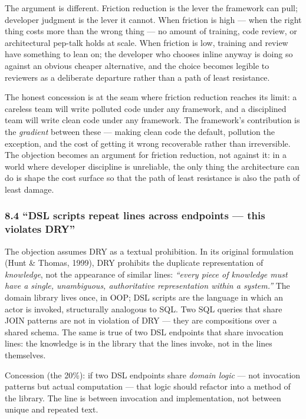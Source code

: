 \documentclass[
]{article}
\begin{document}
The argument is different. Friction reduction is the lever the framework
can pull; developer judgment is the lever it cannot. When friction is
high --- when the right thing costs more than the wrong thing --- no
amount of training, code review, or architectural pep-talk holds at
scale. When friction is low, training and review have something to lean
on; the developer who chooses inline anyway is doing so against an
obvious cheaper alternative, and the choice becomes legible to reviewers
as a deliberate departure rather than a path of least resistance.

The honest concession is at the seam where friction reduction reaches
its limit: a careless team will write polluted code under any framework,
and a disciplined team will write clean code under any framework. The
framework's contribution is the \emph{gradient} between these --- making
clean code the default, pollution the exception, and the cost of getting
it wrong recoverable rather than irreversible. The objection becomes an
argument for friction reduction, not against it: in a world where
developer discipline is unreliable, the only thing the architecture can
do is shape the cost surface so that the path of least resistance is
also the path of least damage.

\subsubsection{8.4 ``DSL scripts repeat lines across endpoints --- this
violates
DRY''}\label{dsl-scripts-repeat-lines-across-endpoints-this-violates-dry}

The objection assumes DRY as a textual prohibition. In its original
formulation (Hunt \& Thomas, 1999), DRY prohibits the duplicate
representation of \emph{knowledge}, not the appearance of similar lines:
\emph{``every piece of knowledge must have a single, unambiguous,
authoritative representation within a system.''} The domain library
lives once, in OOP; DSL scripts are the language in which an actor is
invoked, structurally analogous to SQL. Two SQL queries that share JOIN
patterns are not in violation of DRY --- they are compositions over a
shared schema. The same is true of two DSL endpoints that share
invocation lines: the knowledge is in the library that the lines invoke,
not in the lines themselves.

Concession (the 20\%): if two DSL endpoints share \emph{domain logic}
--- not invocation patterns but actual computation --- that logic should
refactor into a method of the library. The line is between invocation
and implementation, not between unique and repeated text.
\end{document}
